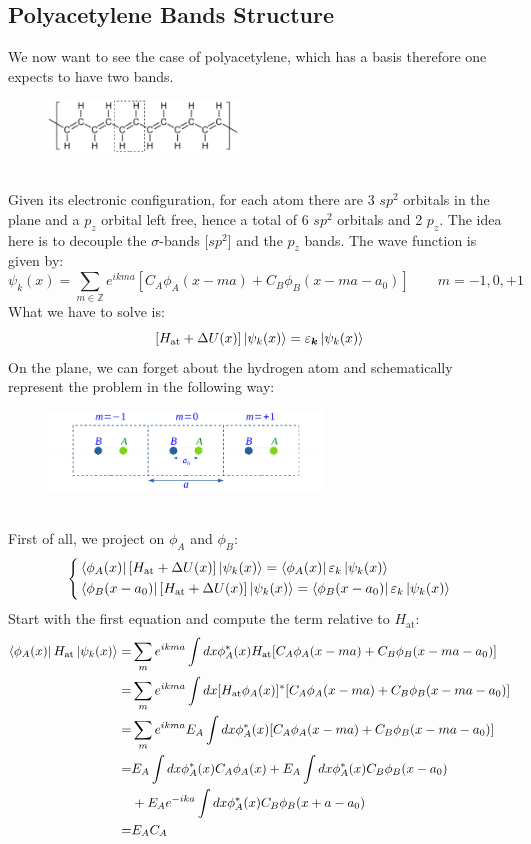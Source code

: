 \documentclass[10.75pt,a4paper,openright,bottom=2cm]{article}
\renewcommand{\Vec}[1]{\boldsymbol{#1}}
\begin{document}
\subsection{Polyacetylene Bands Structure}
We now want to see the case of polyacetylene, which has a basis therefore one expects to have two bands.
\begin{figure}[h]
    \centering
    \includegraphics[width=0.45\textwidth]{polyacetylene.pdf}
    \label{fig:polyacetylene}
\end{figure}\\
\noindent
Given its electronic configuration, for each atom there are 3 $sp^2$ orbitals in the plane and a $p_z$ orbital left free, hence a total of 6 $sp^2$ orbitals and 2 $p_z$. The idea here is to decouple the $\sigma$-bands [$sp^2$] and the $p_z$ bands. The wave function is given by:
\[
\psi_k(x)=\sum_{m\in\mathbb{Z}}e^{ikma}[C_A\phi_A(x-ma)+C_B\phi_B(x-ma-a_0)] \qquad m=-1,0,+1
\]
What we have to solve is:
\[
[H_{\text{at}}+\Delta U(x)]\ket{\psi_k(x)}=\varepsilon_{\Vec{k}}\ket{\psi_k(x)}
\]
\newpage\noindent
On the plane, we can forget about the hydrogen atom and schematically represent the problem in the following way:
\begin{figure}[h]
    \centering
    \includegraphics[width=0.65\textwidth]{polyscheme.pdf}
    \label{fig:polyscheme}
\end{figure}\\
\noindent
First of all, we project on $\phi_A$ and $\phi_B$:
\[
\left\{
\begin{aligned}
&\bra{\phi_A(x)}[H_{\text{at}}+\Delta U(x)]\ket{\psi_k(x)}=\bra{\phi_A(x)}\varepsilon_k\ket{\psi_k(x)}\\
&\bra{\phi_B(x-a_0)}[H_{\text{at}}+\Delta U(x)]\ket{\psi_k(x)}=\bra{\phi_B(x-a_0)}\varepsilon_k\ket{\psi_k(x)}
\end{aligned}
\right.
\]
Start with the first equation and compute the term relative to $H_{\text{at}}$:
\begin{align*}
\bra{\phi_A(x)}H_{\text{at}}\ket{\psi_k(x)}=&\sum_me^{ikma}\int dx\phi_A^*(x)H_{\text{at}}[C_A\phi_A(x-ma)+C_B\phi_B(x-ma-a_0)]\\
=&\sum_me^{ikma}\int dx[H_{\text{at}}\phi_A(x)]^*[C_A\phi_A(x-ma)+C_B\phi_B(x-ma-a_0)]\\
=&\sum_me^{ikma}E_A\int dx\phi_A^*(x)[C_A\phi_A(x-ma)+C_B\phi_B(x-ma-a_0)]\\
=&E_A\int dx\phi_A^*(x)C_A\phi_A(x)+E_A\int dx\phi_A^*(x)C_B\phi_B(x-a_0)\\
&+E_Ae^{-ika}\int dx\phi_A^*(x)C_B\phi_B(x+a-a_0)\\
=&E_AC_A
\end{align*}
\end{document}
